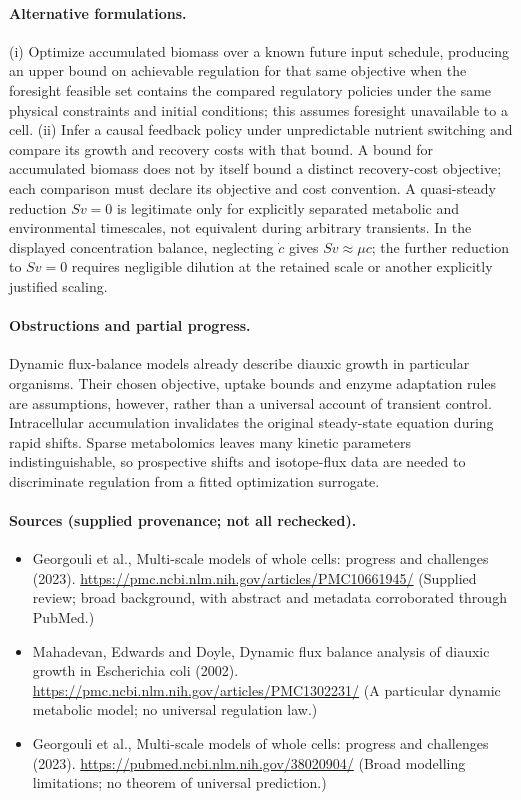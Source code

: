 \documentclass[11pt]{article}
\begin{document}
\paragraph{Alternative formulations.} (i) Optimize accumulated biomass over a known future input schedule, producing an upper bound on achievable regulation for that same objective when the foresight feasible set contains the compared regulatory policies under the same physical constraints and initial conditions; this assumes foresight unavailable to a cell. (ii) Infer a causal feedback policy under unpredictable nutrient switching and compare its growth and recovery costs with that bound. A bound for accumulated biomass does not by itself bound a distinct recovery-cost objective; each comparison must declare its objective and cost convention. A quasi-steady reduction $Sv=0$ is legitimate only for explicitly separated metabolic and environmental timescales, not equivalent during arbitrary transients. In the displayed concentration balance, neglecting $\dot c$ gives $Sv\approx\mu c$; the further reduction to $Sv=0$ requires negligible dilution at the retained scale or another explicitly justified scaling.
\paragraph{Obstructions and partial progress.} Dynamic flux-balance models already describe diauxic growth in particular organisms. Their chosen objective, uptake bounds and enzyme adaptation rules are assumptions, however, rather than a universal account of transient control. Intracellular accumulation invalidates the original steady-state equation during rapid shifts. Sparse metabolomics leaves many kinetic parameters indistinguishable, so prospective shifts and isotope-flux data are needed to discriminate regulation from a fitted optimization surrogate.
\paragraph{Sources (supplied provenance; not all rechecked).}
\begin{itemize}
\item Georgouli et al., Multi-scale models of whole cells: progress and challenges (2023). \url{https://pmc.ncbi.nlm.nih.gov/articles/PMC10661945/} (Supplied review; broad background, with abstract and metadata corroborated through PubMed.)
\item Mahadevan, Edwards and Doyle, Dynamic flux balance analysis of diauxic growth in Escherichia coli (2002). \url{https://pmc.ncbi.nlm.nih.gov/articles/PMC1302231/} (A particular dynamic metabolic model; no universal regulation law.)
\item Georgouli et al., Multi-scale models of whole cells: progress and challenges (2023). \url{https://pubmed.ncbi.nlm.nih.gov/38020904/} (Broad modelling limitations; no theorem of universal prediction.)
\end{itemize}
\end{document}
